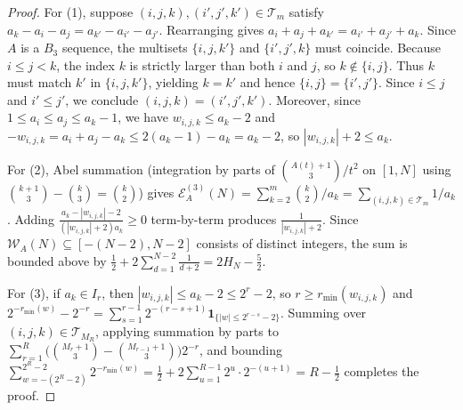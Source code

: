 \documentclass[11pt,a4paper]{article}
\theoremstyle{remark}
\begin{document}
\begin{proof}
For (1), suppose $(i, j, k), (i', j', k') \in \mathcal{T}_m$ satisfy $a_k - a_i - a_j = a_{k'} - a_{i'} - a_{j'}$. Rearranging gives $a_i + a_j + a_{k'} = a_{i'} + a_{j'} + a_k$. Since $A$ is a $B_3$ sequence, the multisets $\{i, j, k'\}$ and $\{i', j', k\}$ must coincide. Because $i \le j < k$, the index $k$ is strictly larger than both $i$ and $j$, so $k \notin \{i, j\}$. Thus $k$ must match $k'$ in $\{i, j, k'\}$, yielding $k = k'$ and hence $\{i, j\} = \{i', j'\}$. Since $i \le j$ and $i' \le j'$, we conclude $(i, j, k) = (i', j', k')$. Moreover, since $1 \le a_i \le a_j \le a_k - 1$, we have $w_{i,j,k} \le a_k - 2$ and $-w_{i,j,k} = a_i + a_j - a_k \le 2(a_k - 1) - a_k = a_k - 2$, so $|w_{i,j,k}| + 2 \le a_k$.

For (2), Abel summation (integration by parts of $\binom{A(t)+1}{3}/t^2$ on $[1, N]$ using $\binom{k+1}{3} - \binom{k}{3} = \binom{k}{2}$) gives $\mathcal{E}_A^{(3)}(N) = \sum_{k=2}^m \binom{k}{2}/a_k = \sum_{(i,j,k) \in \mathcal{T}_m} 1/a_k$. Adding $\frac{a_k - |w_{i,j,k}| - 2}{(|w_{i,j,k}| + 2)a_k} \ge 0$ term-by-term produces $\frac{1}{|w_{i,j,k}| + 2}$. Since $\mathcal{W}_A(N) \subseteq [-(N-2), N-2]$ consists of distinct integers, the sum is bounded above by $\frac{1}{2} + 2\sum_{d=1}^{N-2} \frac{1}{d + 2} = 2 H_N - \frac{5}{2}$.

For (3), if $a_k \in I_r$, then $|w_{i,j,k}| \le a_k - 2 \le 2^r - 2$, so $r \ge r_{\min}(w_{i,j,k})$ and $2^{-r_{\min}(w)} - 2^{-r} = \sum_{s=1}^{r-1} 2^{-(r-s+1)} \mathbf{1}_{\{|w| \le 2^{r-s}-2\}}$. Summing over $(i, j, k) \in \mathcal{T}_{M_R}$, applying summation by parts to $\sum_{r=1}^R \bigl(\binom{M_r+1}{3} - \binom{M_{r-1}+1}{3}\bigr) 2^{-r}$, and bounding $\sum_{w = -(2^R-2)}^{2^R-2} 2^{-r_{\min}(w)} = \frac{1}{2} + 2\sum_{u=1}^{R-1} 2^u \cdot 2^{-(u+1)} = R - \frac{1}{2}$ completes the proof.
\end{proof}
\end{document}
